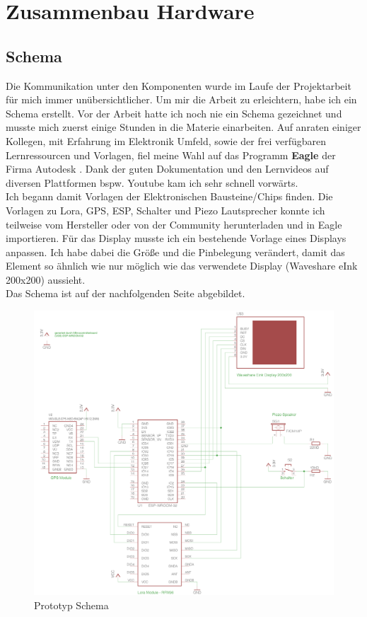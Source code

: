\documentclass[11pt,english,german]{report}
\theoremstyle{definition}
\begin{document}
\newpage
\section{Zusammenbau Hardware}
\subsection{Schema}
Die Kommunikation unter den Komponenten wurde im Laufe der Projektarbeit  für mich immer unübersichtlicher. Um mir die Arbeit zu erleichtern, habe ich ein Schema %
erstellt. Vor der Arbeit hatte ich noch nie ein Schema gezeichnet und musste mich zuerst einige Stunden in die Materie einarbeiten. Auf anraten einiger Kollegen, mit Erfahrung im Elektronik Umfeld, sowie der frei verfügbaren Lernressourcen und Vorlagen, fiel meine Wahl auf das Programm \textbf{Eagle} der Firma Autodesk \cite{autodesk}. Dank der guten Dokumentation und den Lernvideos auf diversen Plattformen bspw. Youtube kam ich sehr schnell vorwärts. \\[0.3cm] 
Ich begann damit Vorlagen der Elektronischen Bausteine/Chips finden. Die Vorlagen zu Lora, GPS, ESP, Schalter und Piezo Lautsprecher konnte ich teilweise vom Hersteller oder von der Community herunterladen und in Eagle importieren. Für das Display musste ich ein bestehende Vorlage eines Displays anpassen. Ich habe dabei die Größe und die Pinbelegung verändert, damit das Element so ähnlich wie nur möglich wie das verwendete Display (Waveshare eInk 200x200) aussieht. \\[0.3cm]
Das Schema ist auf der nachfolgenden Seite abgebildet.
\newpage

\begin{figure}[H]
	\centering
	\includegraphics[width=\textwidth]{img/prototyp_schema.png}
	\caption[Prototyp2 Schema]
	{Prototyp Schema}
\end{figure}
\end{document}

